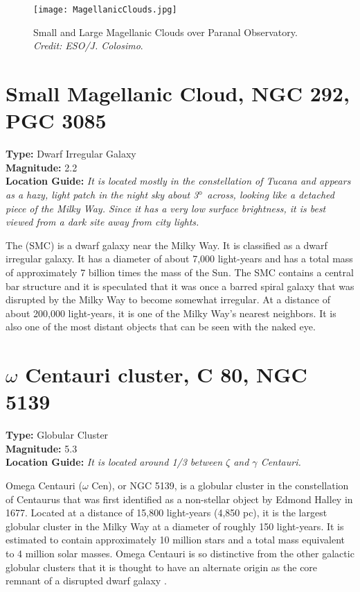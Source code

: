\begin{figure}[ht]
\texttt{[image: MagellanicClouds.jpg]}
\caption{Small and Large Magellanic Clouds over Paranal Observatory. \emph{Credit: ESO/J. Colosimo}.}
\label{fig:MagellanicClouds}
\end{figure}

\section{Small Magellanic Cloud, NGC 292, PGC 3085}
\textbf{Type:} Dwarf Irregular Galaxy \\
\textbf{Magnitude:} 2.2 \\ 
\textbf{Location Guide:} \textit{It is located mostly in the constellation of Tucana and appears as a hazy, light patch in the night sky about 3$\degree$ across, looking like a detached piece of the Milky Way. Since it has a very low surface brightness, it is best viewed from a dark site away from city lights.}

The  (SMC) is a dwarf galaxy near the Milky Way. It is classified as a dwarf irregular galaxy. It has a diameter of about 7,000 light-years and has a total mass of approximately 7 billion times the mass of the Sun. The SMC contains a central bar structure and it is speculated that it was once a barred spiral galaxy that was disrupted by the Milky Way to become somewhat irregular. At a distance of about 200,000 light-years, it is one of the Milky Way's nearest neighbors. It is also one of the most distant objects that can be seen with the naked eye.

\section{\texorpdfstring{$\omega$}{omega} Centauri cluster, C 80, NGC 5139}
\textbf{Type:} Globular Cluster \\
\textbf{Magnitude:} 5.3 \\ 
\textbf{Location Guide:} \textit{It is located around 1/3 between $\zeta$ and $\gamma$ Centauri.}

Omega Centauri ($\omega$ Cen), or NGC 5139, is a globular cluster in the constellation of Centaurus that was first identified as a non-stellar object by Edmond Halley in 1677. Located at a distance of 15,800 light-years (4,850 pc), it is the largest globular cluster in the Milky Way at a diameter of roughly 150 light-years. It is estimated to contain approximately 10 million stars and a total mass equivalent to 4 million solar masses. Omega Centauri is so distinctive from the other galactic globular clusters that it is thought to have an alternate origin as the core remnant of a disrupted dwarf galaxy \cite{2008ApJ...676.1008N}.

